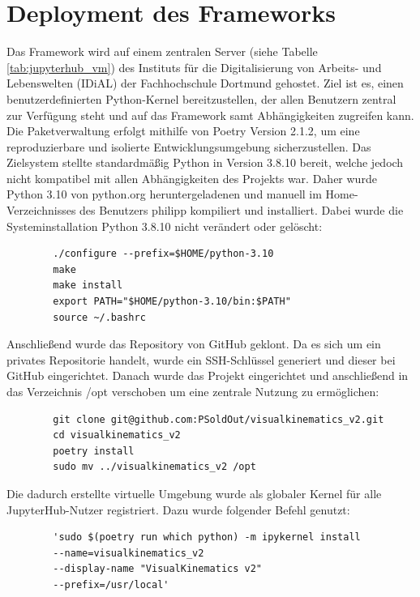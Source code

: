 \section{Deployment des Frameworks}
Das Framework wird auf einem zentralen Server (siehe Tabelle \ref{tab:jupyterhub_vm}) des Instituts für die Digitalisierung von Arbeits- und Lebenswelten (IDiAL) der Fachhochschule Dortmund gehostet.
Ziel ist es, einen benutzerdefinierten Python-Kernel bereitzustellen,
der allen Benutzern zentral zur Verfügung steht und auf das Framework samt Abhängigkeiten zugreifen kann.
Die Paketverwaltung erfolgt mithilfe von Poetry Version 2.1.2, um eine reproduzierbare und isolierte Entwicklungsumgebung sicherzustellen.
Das Zielsystem stellte standardmäßig Python in Version 3.8.10 bereit,
welche jedoch nicht kompatibel mit allen Abhängigkeiten des Projekts war.
Daher wurde Python 3.10 von python.org heruntergeladenen und manuell im Home-Verzeichnisses des Benutzers philipp kompiliert und installiert.
Dabei wurde die Systeminstallation Python 3.8.10 nicht verändert oder gelöscht:

\begin{center}
    \begin{verbatim}
        ./configure --prefix=$HOME/python-3.10
        make
        make install
        export PATH="$HOME/python-3.10/bin:$PATH"
        source ~/.bashrc
    \end{verbatim}
\end{center}

Anschließend wurde das Repository von GitHub geklont.
Da es sich um ein privates Repositorie handelt, wurde ein SSH-Schlüssel generiert und dieser bei GitHub eingerichtet.
Danach wurde das Projekt eingerichtet und anschließend in das Verzeichnis /opt verschoben um eine zentrale Nutzung zu ermöglichen:

\begin{center}
    \begin{verbatim}
        git clone git@github.com:PSoldOut/visualkinematics_v2.git
        cd visualkinematics_v2
        poetry install
        sudo mv ../visualkinematics_v2 /opt
    \end{verbatim}
\end{center}

Die dadurch erstellte virtuelle Umgebung wurde als globaler Kernel für alle JupyterHub-Nutzer registriert. Dazu wurde
folgender Befehl genutzt:



 \begin{center}
    \begin{verbatim}
        'sudo $(poetry run which python) -m ipykernel install
        --name=visualkinematics_v2
        --display-name "VisualKinematics v2"
        --prefix=/usr/local'
    \end{verbatim}
\end{center}

